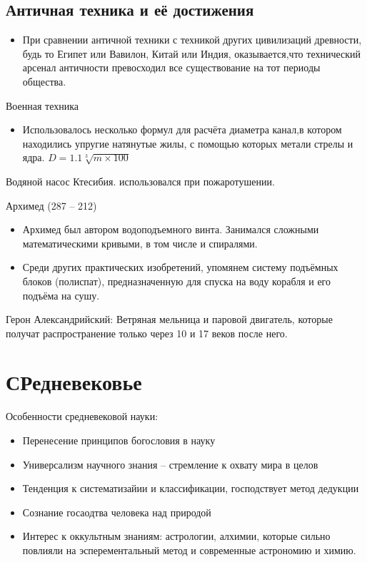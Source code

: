 \documentclass{book}
\theoremstyle{definition}
\begin{document}
    \subsection{Античная техника и её достижения}

    \begin{itemize}
        \item  При сравнении античной техники с техникой других цивилизаций древности, будь то Египет или Вавилон, Китай или Индия, оказывается,что технический арсенал античности превосходил все существование на тот периоды общества.
    \end{itemize}

    Военная техника
    \begin{itemize}
        \item Использовалось несколько формул для расчёта диаметра канал,в  котором находились упругие натянутые жилы, с помощью которых метали стрелы и ядра. $D = 1.1 \sqrt[3]{m\times 100} $
    \end{itemize}

    Водяной насос Ктесибия. использовался при пожаротушении.

    Архимед (287 -- 212)
    \begin{itemize}
        \item Архимед был автором водоподъемного винта. Занимался сложными математическими кривыми, в том числе и спиралями.
        \item Среди других практических изобретений, упомянем систему подъёмных блоков (полиспат), предназначенную для спуска на воду корабля и его подъёма на сушу.
    \end{itemize}

    Герон Александрийский: Ветряная мельница и паровой двигатель, которые получат распространение только через 10 и 17 веков после него.

    \section{СРедневековье}

    Особенности средневековой науки:
    \begin{itemize}
        \item Перенесение принципов богословия в науку
        \item Универсализм научного знания -- стремление к охвату мира в целов
        \item Тенденция к систематизайии и классификации, господствует метод дедукции
        \item Сознание госаодтва человека над природой
        \item Интерес к оккультным знаниям: астрологии, алхимии, которые сильно повлияли на эсперементальный метод и современные астрономию и химию.
    \end{itemize}
\end{document}
